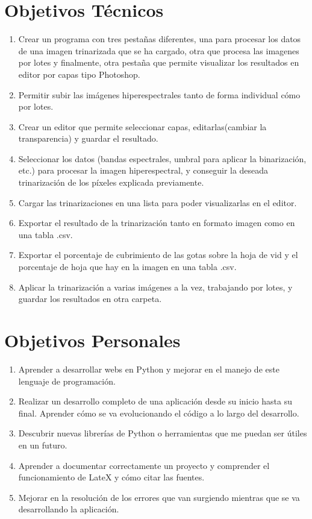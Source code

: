 \section {Objetivos Técnicos} 
\begin{enumerate}
    \item Crear un programa con tres pestañas diferentes, una para procesar los datos de una imagen trinarizada que se ha cargado, otra que procesa las imagenes por lotes y finalmente, otra pestaña que permite visualizar los resultados en editor por capas tipo Photoshop.
    \item Permitir subir las imágenes hiperespectrales tanto de forma individual cómo por lotes.
    \item Crear un editor que permite seleccionar capas, editarlas(cambiar la transparencia) y guardar el resultado.
    \item Seleccionar los datos (bandas espectrales, umbral para aplicar la binarización, etc.) para procesar la imagen hiperespectral, y conseguir la deseada trinarización de los píxeles explicada previamente.
    \item Cargar las trinarizaciones en una lista para poder visualizarlas en el editor.
    \item Exportar el resultado de la trinarización tanto en formato imagen como en una tabla .csv.
    \item Exportar el porcentaje de cubrimiento de las gotas sobre la hoja de vid y el porcentaje de hoja que hay en la imagen en una tabla .csv.
    \item Aplicar la trinarización a varias imágenes a la vez, trabajando por lotes, y guardar los resultados en otra carpeta.
\end{enumerate}

\section {Objetivos Personales} 
\begin{enumerate}
    \item Aprender a desarrollar webs en Python y mejorar en el manejo de este lenguaje de programación.
    \item Realizar un desarrollo completo de una aplicación desde su inicio hasta su final. Aprender cómo se va evolucionando el código a lo largo del desarrollo.
    \item Descubrir nuevas librerías de Python o herramientas que me puedan ser útiles en un futuro.
    \item Aprender a documentar correctamente un proyecto y comprender el funcionamiento de LateX y cómo citar las fuentes.
    \item Mejorar en la resolución de los errores que van surgiendo mientras que se va desarrollando la aplicación.
\end{enumerate}
